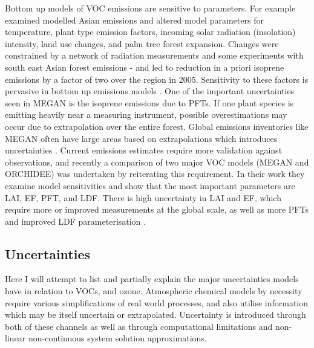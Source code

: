     
    Bottom up models of VOC emissions are sensitive to parameters.
    For example \textcite{Stavrakou2014} examined modelled Asian emissions and altered model parameters for temperature, plant type emission factors, incoming solar radiation (insolation) intensity, land use changes, and palm tree forest expansion.
    Changes were constrained by a network of radiation measurements and some experiments with south east Asian forest emissions - and led to reduction in a priori isoprene emissions by a factor of two over the region in 2005.
    Sensitivity to these factors is pervasive in bottom up emissions models \parencite[eg.][]{Marais2014,Miller2014,Messina2016}.
    One of the important uncertainties seen in MEGAN is the isoprene emissions due to PFTs.
    If one plant species is emitting heavily near a measuring instrument, possible overestimations may occur due to extrapolation over the entire forest.
    Global emissions inventories like MEGAN often have large areas based on extrapolations which introduces uncertainties \parencite{Miller2014}.
    Current emissions estimates require more validation against observations, and recently a comparison of two major VOC models (MEGAN and ORCHIDEE) was undertaken by \textcite{Messina2016} reiterating this requirement.
    In their work they examine model sensitivities and show that the most important parameters are LAI, EF, PFT, and LDF.
    There is high uncertainty in LAI and EF, which require more or improved measurements at the global scale, as well as more PFTs and improved LDF parameterisation \parencite{Messina2016}.
    
  
  \subsection{Uncertainties}
  \label{LR:Models:Uncert}
    
    Here I will attempt to list and partially explain the major uncertainties models have in relation to  VOCs, and ozone.
    Atmospheric chemical models by necessity require various simplifications of real world processes, and also utilise information which may be itself uncertain or extrapolated.
    Uncertainty is introduced through both of these channels as well as through computational limitations and non-linear non-continuous system solution approximations.
    
